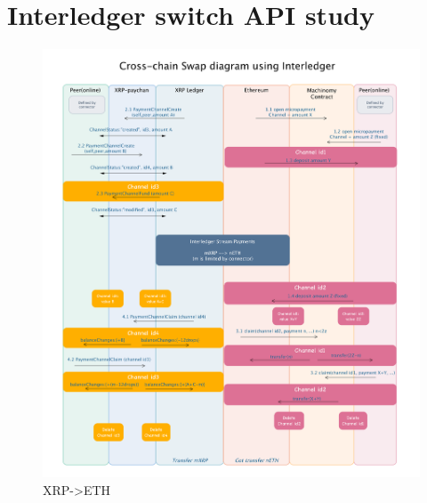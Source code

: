 \section{Interledger switch API study}
\begin{figure}[H]
	\includegraphics[width=1.5\textwidth]{./figures/XRP->ETH}
        \centering
        \caption{XRP->ETH}
        \centering
        \label{fig:xtoe}

\end{figure}
